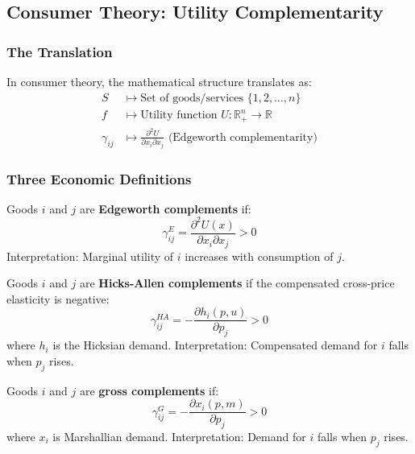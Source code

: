 \subsection{Consumer Theory: Utility Complementarity}

\subsubsection{The Translation}

\begin{axiom}
In consumer theory, the mathematical structure translates as:
\begin{align}
S &\mapsto \text{Set of goods/services } \{1, 2, \ldots, n\} \\
f &\mapsto \text{Utility function } U: \mathbb{R}^n_+ \to \mathbb{R} \\
\gamma_{ij} &\mapsto \frac{\partial^2 U}{\partial x_i \partial x_j} \text{ (Edgeworth complementarity)}
\end{align}
\end{axiom}

\subsubsection{Three Economic Definitions}

\begin{definition}
Goods $i$ and $j$ are \textbf{Edgeworth complements} if:
\begin{equation}
\gamma^E_{ij} = \frac{\partial^2 U(x)}{\partial x_i \partial x_j} > 0
\end{equation}
Interpretation: Marginal utility of $i$ increases with consumption of $j$.
\end{definition}

\begin{definition}
Goods $i$ and $j$ are \textbf{Hicks-Allen complements} if the compensated cross-price elasticity is negative:
\begin{equation}
\gamma^{HA}_{ij} = -\frac{\partial h_i(p, u)}{\partial p_j} > 0
\end{equation}
where $h_i$ is the Hicksian demand. Interpretation: Compensated demand for $i$ falls when $p_j$ rises.
\end{definition}

\begin{definition}
Goods $i$ and $j$ are \textbf{gross complements} if:
\begin{equation}
\gamma^G_{ij} = -\frac{\partial x_i(p, m)}{\partial p_j} > 0
\end{equation}
where $x_i$ is Marshallian demand. Interpretation: Demand for $i$ falls when $p_j$ rises.
\end{definition}

